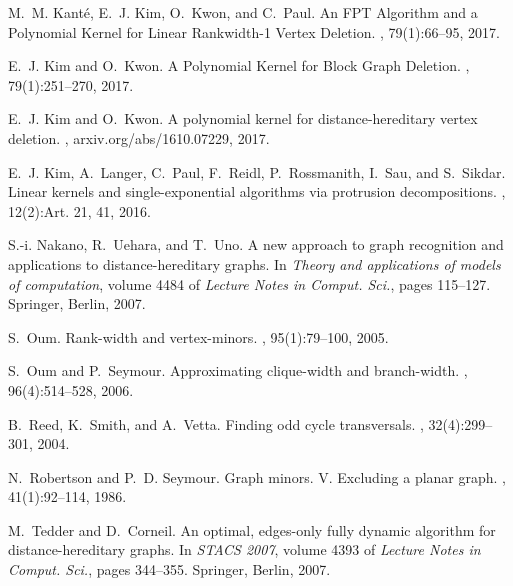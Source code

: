 \documentclass[11pt]{elsarticle}
\begin{document}
\begin{thebibliography}{10}
M.~M. Kant\'e, E.~J. Kim, O.~Kwon, and C.~Paul.
\newblock An {FPT} {A}lgorithm and a {P}olynomial {K}ernel for {L}inear
  {R}ankwidth-1 {V}ertex {D}eletion.
, 79(1):66--95, 2017.

E.~J. Kim and O.~Kwon.
\newblock A {P}olynomial {K}ernel for {B}lock {G}raph {D}eletion.
, 79(1):251--270, 2017.

E.~J. Kim and O.~Kwon.
\newblock A polynomial kernel for distance-hereditary vertex deletion.
, arxiv.org/abs/1610.07229, 2017.

E.~J. Kim, A.~Langer, C.~Paul, F.~Reidl, P.~Rossmanith, I.~Sau, and S.~Sikdar.
\newblock Linear kernels and single-exponential algorithms via protrusion
  decompositions.
, 12(2):Art. 21, 41, 2016.

S.-i. Nakano, R.~Uehara, and T.~Uno.
\newblock A new approach to graph recognition and applications to
  distance-hereditary graphs.
\newblock In {\em Theory and applications of models of computation}, volume
  4484 of {\em Lecture Notes in Comput. Sci.}, pages 115--127. Springer,
  Berlin, 2007.

S.~Oum.
\newblock Rank-width and vertex-minors.
, 95(1):79--100, 2005.

S.~Oum and P.~Seymour.
\newblock Approximating clique-width and branch-width.
, 96(4):514--528, 2006.

B.~Reed, K.~Smith, and A.~Vetta.
\newblock Finding odd cycle transversals.
, 32(4):299--301, 2004.

N.~Robertson and P.~D. Seymour.
\newblock Graph minors. {V}. {E}xcluding a planar graph.
, 41(1):92--114, 1986.

M.~Tedder and D.~Corneil.
\newblock An optimal, edges-only fully dynamic algorithm for
  distance-hereditary graphs.
\newblock In {\em S{TACS} 2007}, volume 4393 of {\em Lecture Notes in Comput.
  Sci.}, pages 344--355. Springer, Berlin, 2007.

\end{thebibliography}
\end{document}
